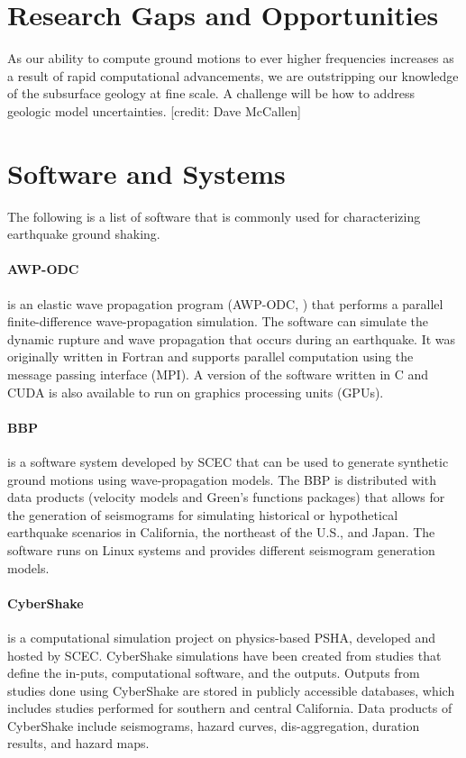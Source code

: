 \section{Research Gaps and Opportunities}
\label{sec:eq_shake_gaps}

As our ability to compute ground motions to ever higher frequencies increases as a result of rapid computational advancements, we are outstripping our knowledge of the subsurface geology at fine scale. A challenge will be how to address geologic model uncertainties. [credit: Dave McCallen]

\section{Software and Systems}
\label{sec:eq_shake_tools}

The following is a list of software that is commonly used for characterizing earthquake ground shaking.

\paragraph{AWP-ODC}  is an elastic wave propagation program (AWP-ODC, \cite{cui2010scalable}) that performs a parallel finite-difference wave-propagation simulation. The software can simulate the dynamic rupture and wave propagation that occurs during an earthquake. It was originally written in Fortran and supports parallel computation using the message passing interface (MPI). A version of the software written in C and CUDA is also available to run on graphics processing units (GPUs).

\paragraph{BBP}  \citep{maechling2015scec} is a software system developed by SCEC that can be used to generate synthetic ground motions using wave-propagation models. The BBP is distributed with data products (velocity models and Green's functions packages) that allows for the generation of seismograms for simulating historical or hypothetical earthquake scenarios in California, the northeast of the U.S., and Japan. The software runs on Linux systems and provides different seismogram generation models.

\paragraph{CyberShake}  is a computational simulation project on physics-based PSHA, developed and hosted by SCEC. CyberShake simulations have been created from studies that define the in-puts, computational software, and the outputs. Outputs from studies done using CyberShake are stored in publicly accessible databases, which includes studies performed for southern and central California. Data products of CyberShake include seismograms, hazard curves, dis-aggregation, duration results, and hazard maps.

